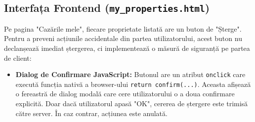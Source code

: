 \documentclass[12pt, a4paper, oneside, romanian]{teza-upb}
\begin{document}
\subsection{Interfața Frontend (\texttt{my\_properties.html})}
Pe pagina "Cazările mele", fiecare proprietate listată are un buton de "Șterge". Pentru a preveni acțiunile accidentale din partea utilizatorului, acest buton nu declanșează imediat ștergerea, ci implementează o măsură de siguranță pe partea de client:
\begin{itemize}
	\item \textbf{Dialog de Confirmare JavaScript:} Butonul are un atribut \texttt{onclick} care execută funcția nativă a browser-ului \texttt{return confirm(...)}. Aceasta afișează o fereastră de dialog modală care cere utilizatorului o a doua confirmare explicită. Doar dacă utilizatorul apasă "OK", cererea de ștergere este trimisă către server. În caz contrar, acțiunea este anulată.
\end{itemize}
\end{document}
